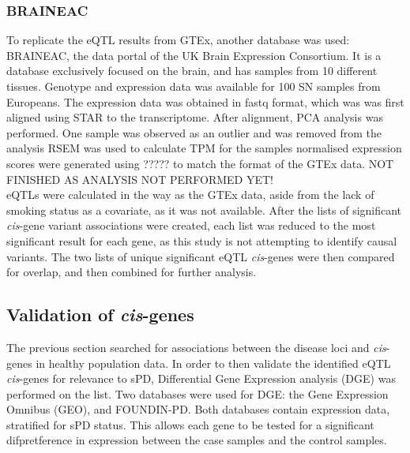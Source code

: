 \documentclass{article}
\begin{document}
\subsubsection{BRAINEAC}
To replicate the eQTL results from GTEx, another database was used: BRAINEAC\cite{Ramasamy2014GeneticBrain}, the data portal of the UK Brain Expression Consortium. It is a database exclusively focused on the brain, and has samples from 10 different tissues. Genotype and expression data was available for 100 SN samples from Europeans. The expression data was obtained in fastq format, which was was first aligned using STAR\cite{Dobin2013STAR:Aligner} to the transcriptome. After alignment, PCA analysis was performed. One sample was observed as an outlier and was removed from the analysis
RSEM\cite{li211} was used to calculate TPM for the samples
normalised expression scores were generated using ????? to match the format of the GTEx data. NOT FINISHED AS ANALYSIS NOT PERFORMED YET!
\\eQTLs were calculated in the way as the GTEx data, aside from the lack of smoking status as a covariate, as it was not available.
After the lists of significant \textit{cis}-gene variant associations were created, each list was reduced to the most significant result for each gene, as this study is not attempting to identify causal variants. The two lists of unique significant eQTL \textit{cis}-genes were then compared for overlap, and then combined for further analysis. 
\subsection{Validation of \textit{cis}-genes}
The previous section searched for associations between the disease loci and \textit{cis}-genes in healthy population data. In order to then validate the identified eQTL \textit{cis}-genes for relevance to sPD, Differential Gene Expression analysis (DGE) was performed on the list. Two databases were used for DGE: the Gene Expression Omnibus (GEO), and FOUNDIN-PD. Both databases contain expression data, stratified for sPD status. This allows each gene to be tested for a significant difpretference in expression between the case samples and the control samples. 
\end{document}
